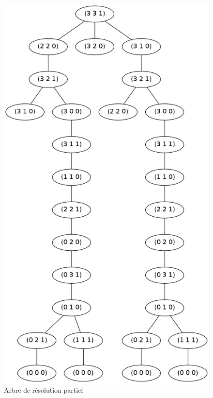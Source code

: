 \documentclass[a4paper, 12pt, leqno]{report}
\theoremstyle{plain}
\begin{document}
            \begin{figure}[h]
            \begin{center}
            \includegraphics[scale=0.40]{graph.png}
            \end{center}
            \caption{Arbre de résolution partiel}
            \label{Arbre de résolution partiel}
            \end{figure}
            
\end{document}
